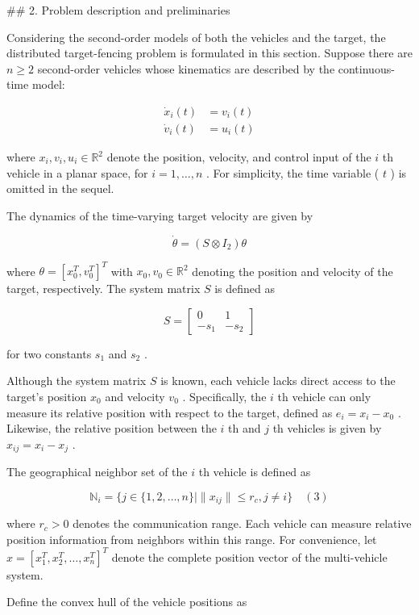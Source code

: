 ## 2. Problem description and preliminaries

Considering the second-order models of both the vehicles and the target, the distributed target-fencing problem is formulated in this section. Suppose there are  $n \geq 2$  second-order vehicles whose kinematics are described by the continuous-time model:

$$\begin{aligned}\dot{x}_i(t) &= v_i(t) \\ \dot{v}_i(t) &= u_i(t)\end{aligned}\tag{1}$$

where  $x_i, v_i, u_i \in \mathbb{R}^2$  denote the position, velocity, and control input of the  $i$ th vehicle in a planar space, for  $i = 1, \dots, n$ . For simplicity, the time variable ( $t$ ) is omitted in the sequel.

The dynamics of the time-varying target velocity are given by

$$\dot{\theta} = (S \otimes I_2)\theta\tag{2}$$

where  $\theta = [x_0^T, v_0^T]^T$  with  $x_0, v_0 \in \mathbb{R}^2$  denoting the position and velocity of the target, respectively. The system matrix  $S$  is defined as

$$S = \begin{bmatrix} 0 & 1 \\ -s_1 & -s_2 \end{bmatrix}$$

for two constants  $s_1$  and  $s_2$ .

Although the system matrix  $S$  is known, each vehicle lacks direct access to the target's position  $x_0$  and velocity  $v_0$ . Specifically, the  $i$ th vehicle can only measure its relative position with respect to the target, defined as  $e_i = x_i - x_0$ . Likewise, the relative position between the  $i$ th and  $j$ th vehicles is given by  $x_{ij} = x_i - x_j$ .

The geographical neighbor set of the  $i$ th vehicle is defined as

$$\mathbb{N}_i = \{j \in \{1, 2, \dots, n\} \mid \|x_{ij}\| \leq r_c, j \neq i\} \quad (3)$$

where  $r_c > 0$  denotes the communication range. Each vehicle can measure relative position information from neighbors within this range. For convenience, let  $x = [x_1^T, x_2^T, \dots, x_n^T]^T$  denote the complete position vector of the multi-vehicle system.

Define the convex hull of the vehicle positions as

